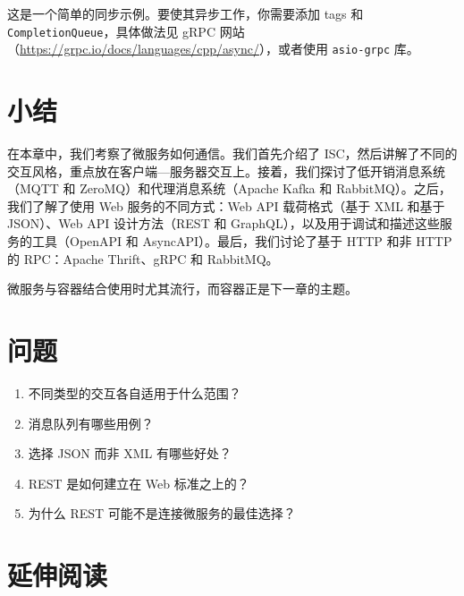 \label{idx:1706}
\label{idx:1707}
这是一个简单的同步示例。要使其异步工作，你需要添加 tags 和 \texttt{Completion\allowbreak{}Queue}，具体做法见 gRPC 网站（\href{https://grpc.io/docs/languages/cpp/async/}{https://grpc.io/docs/languages/cpp/async/}），或者使用 \texttt{asio-grpc} 库。

\section{小结}

在本章中，我们考察了微服务如何通信。我们首先介绍了 ISC，然后讲解了不同的交互风格，重点放在客户端—服务器交互上。接着，我们探讨了低开销消息系统（MQTT 和 ZeroMQ）和代理消息系统（Apache Kafka 和 RabbitMQ）。之后，我们了解了使用 Web 服务的不同方式：Web API 载荷格式（基于 XML 和基于 JSON）、Web API 设计方法（REST 和 GraphQL），以及用于调试和描述这些服务的工具（OpenAPI 和 AsyncAPI）。最后，我们讨论了基于 HTTP 和非 HTTP 的 RPC：Apache Thrift、gRPC 和 RabbitMQ。

微服务与容器结合使用时尤其流行，而容器正是下一章的主题。

\section{问题}

\begin{enumerate}
\item 不同类型的交互各自适用于什么范围？
\item 消息队列有哪些用例？
\item 选择 JSON 而非 XML 有哪些好处？
\item REST 是如何建立在 Web 标准之上的？
\item 为什么 REST 可能不是连接微服务的最佳选择？
\end{enumerate}

\section{延伸阅读}

